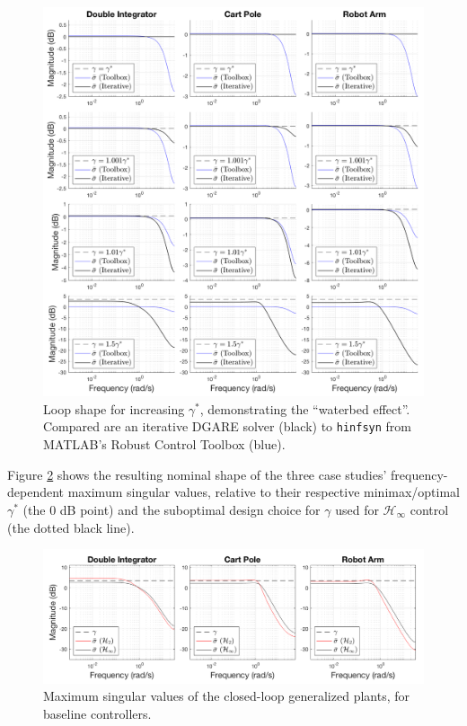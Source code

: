 \begin{figure}[H]
\centering
	\includegraphics[width=\textwidth]{figures/waterbed_effect.png}
\caption{Loop shape for increasing $\gamma^{*}$, demonstrating the ``waterbed effect''.  Compared are an iterative DGARE solver (black) to \texttt{hinfsyn} from MATLAB's Robust Control Toolbox (blue).}
\label{fig:waterbed_effect}
\end{figure}

Figure \ref{fig:baseline_singular_values} shows the resulting nominal shape of the three case studies' frequency-dependent maximum singular values, relative to their respective minimax/optimal $\gamma^{*}$ (the 0 dB point) and the suboptimal design choice for $\gamma$ used for $\mathcal{H}_{\infty}$ control (the dotted black line).
\begin{figure}[H]
\centering
	\includegraphics[width=\textwidth]{figures/baseline_singular_values.png}
\caption{Maximum singular values of the closed-loop generalized plants, for baseline controllers.}
\label{fig:baseline_singular_values}
\end{figure}


